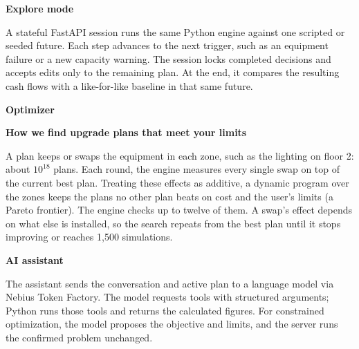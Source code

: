 \documentclass[10pt,a4paper]{article}
\newcommand{\reportsection}[1]{\par\addvspace{4pt}\noindent\textbf{\large #1}\par\nobreak}
\begin{document}
\reportsection{Explore mode}

A stateful FastAPI session runs the same Python engine against one scripted or seeded future. Each step advances to the next trigger, such as an equipment failure or a new capacity warning. The session locks completed decisions and accepts edits only to the remaining plan. At the end, it compares the resulting cash flows with a like-for-like baseline in that same future.

\reportsection{Optimizer}
\textbf{How we find upgrade plans that meet your limits}\par\nobreak

A plan keeps or swaps the equipment in each zone, such as the lighting on floor 2: about $10^{18}$ plans. Each round, the engine measures every single swap on top of the current best plan. Treating these effects as additive, a dynamic program over the zones keeps the plans no other plan beats on cost and the user's limits (a Pareto frontier). The engine checks up to twelve of them. A swap's effect depends on what else is installed, so the search repeats from the best plan until it stops improving or reaches 1,500 simulations.

\reportsection{AI assistant}

The assistant sends the conversation and active plan to a language model via Nebius Token Factory. The model requests tools with structured arguments; Python runs those tools and returns the calculated figures. For constrained optimization, the model proposes the objective and limits, and the server runs the confirmed problem unchanged.
\end{document}
